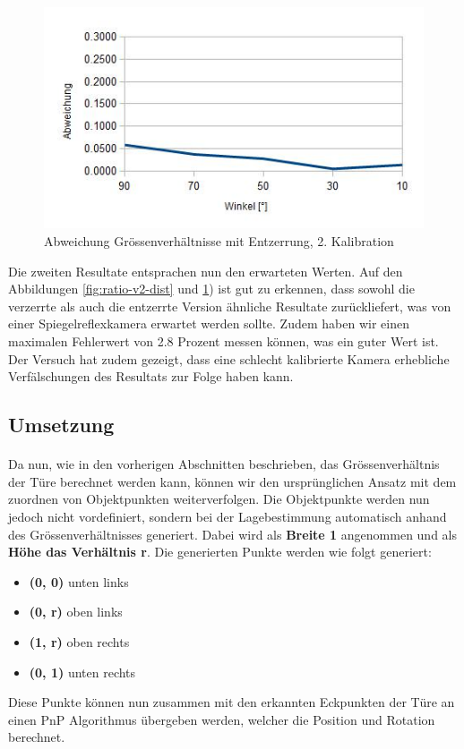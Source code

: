 \begin{figure}[!ht]
  \centering
  \includegraphics[width=0.75\linewidth]{images/ratio_v2_undist.jpg}
  \caption{Abweichung Grössenverhältnisse mit Entzerrung, 2. Kalibration}
  \label{fig:ratio-v2-undist}
\end{figure}

\noindent
Die zweiten Resultate entsprachen nun den erwarteten Werten. Auf den Abbildungen \ref{fig:ratio-v2-dist} und \ref{fig:ratio-v2-undist}) ist gut zu erkennen, dass sowohl die verzerrte als auch die entzerrte Version ähnliche Resultate zurückliefert, was von einer Spiegelreflexkamera erwartet werden sollte. Zudem haben wir einen maximalen Fehlerwert von 2.8 Prozent messen können, was ein guter Wert ist. Der Versuch hat zudem gezeigt, dass eine schlecht kalibrierte Kamera erhebliche Verfälschungen des Resultats zur Folge haben kann. 


\subsection{Umsetzung}
\label{sec:projektion-door}

\paragraph{}
Da nun, wie in den vorherigen Abschnitten beschrieben, das Grössenverhältnis der Türe berechnet werden kann, können wir den ursprünglichen Ansatz mit dem zuordnen von Objektpunkten weiterverfolgen. Die Objektpunkte werden nun jedoch nicht vordefiniert, sondern bei der Lagebestimmung automatisch anhand des Grössenverhältnisses generiert. Dabei wird als \textbf{Breite 1} angenommen und als \textbf{Höhe das Verhältnis r}. Die generierten Punkte werden wie folgt generiert:

\begin{itemize}
\item \textbf{(0, 0)} unten links
\item \textbf{(0, r)} oben links
\item \textbf{(1, r)} oben rechts
\item \textbf{(0, 1)} unten rechts
\end{itemize}
\noindent
Diese Punkte können nun zusammen mit den erkannten Eckpunkten der Türe an einen PnP Algorithmus übergeben werden, welcher die Position und Rotation berechnet.